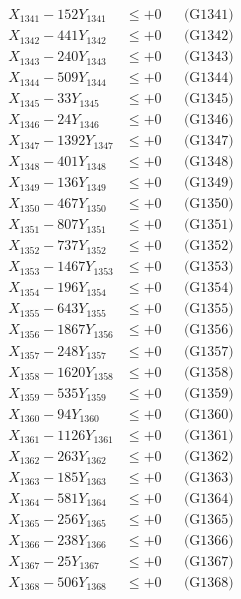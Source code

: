 \documentclass[a4paper,10pt]{article}
\begin{document}
{\begin{align}
\allowbreak
X_{1341} - 152Y_{1341} &\leq +0 && \text{(G1341)} \\
X_{1342} - 441Y_{1342} &\leq +0 && \text{(G1342)} \\
X_{1343} - 240Y_{1343} &\leq +0 && \text{(G1343)} \\
X_{1344} - 509Y_{1344} &\leq +0 && \text{(G1344)} \\
X_{1345} - 33Y_{1345} &\leq +0 && \text{(G1345)} \\
X_{1346} - 24Y_{1346} &\leq +0 && \text{(G1346)} \\
X_{1347} - 1392Y_{1347} &\leq +0 && \text{(G1347)} \\
X_{1348} - 401Y_{1348} &\leq +0 && \text{(G1348)} \\
X_{1349} - 136Y_{1349} &\leq +0 && \text{(G1349)} \\
X_{1350} - 467Y_{1350} &\leq +0 && \text{(G1350)} \\
\allowbreak
X_{1351} - 807Y_{1351} &\leq +0 && \text{(G1351)} \\
X_{1352} - 737Y_{1352} &\leq +0 && \text{(G1352)} \\
X_{1353} - 1467Y_{1353} &\leq +0 && \text{(G1353)} \\
X_{1354} - 196Y_{1354} &\leq +0 && \text{(G1354)} \\
X_{1355} - 643Y_{1355} &\leq +0 && \text{(G1355)} \\
X_{1356} - 1867Y_{1356} &\leq +0 && \text{(G1356)} \\
X_{1357} - 248Y_{1357} &\leq +0 && \text{(G1357)} \\
X_{1358} - 1620Y_{1358} &\leq +0 && \text{(G1358)} \\
X_{1359} - 535Y_{1359} &\leq +0 && \text{(G1359)} \\
X_{1360} - 94Y_{1360} &\leq +0 && \text{(G1360)} \\
\allowbreak
X_{1361} - 1126Y_{1361} &\leq +0 && \text{(G1361)} \\
X_{1362} - 263Y_{1362} &\leq +0 && \text{(G1362)} \\
X_{1363} - 185Y_{1363} &\leq +0 && \text{(G1363)} \\
X_{1364} - 581Y_{1364} &\leq +0 && \text{(G1364)} \\
X_{1365} - 256Y_{1365} &\leq +0 && \text{(G1365)} \\
X_{1366} - 238Y_{1366} &\leq +0 && \text{(G1366)} \\
X_{1367} - 25Y_{1367} &\leq +0 && \text{(G1367)} \\
X_{1368} - 506Y_{1368} &\leq +0 && \text{(G1368)} \\

\end{align}}
\end{document}
